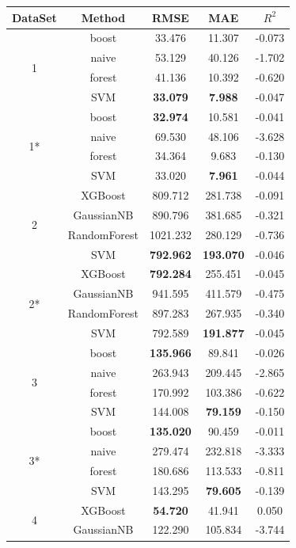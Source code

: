 \documentclass[conference,compsoc]{IEEEtran}
\begin{document}
\begin{table}[!t]
\centering
\begin{tabular}{c|c|c|c|c}
DataSet & Method & RMSE & MAE & $R^2$ \\
\hline
\multirow{4}{*}{1}
& boost & 33.476 & 11.307 & -0.073 \\
& naive & 53.129 & 40.126 & -1.702 \\
& forest & 41.136 & 10.392 & -0.620 \\
& SVM & \textbf{33.079} & \textbf{7.988} & -0.047 \\
\hline
\multirow{4}{*}{1*}
& boost & \textbf{32.974} & 10.581 & -0.041 \\
& naive & 69.530 & 48.106 & -3.628 \\
& forest & 34.364 & 9.683 & -0.130 \\
& SVM & 33.020 & \textbf{7.961} & -0.044 \\
\hline
\multirow{4}{*}{2}
& XGBoost & 809.712 & 281.738 & -0.091 \\
& GaussianNB & 890.796 & 381.685 & -0.321 \\
& RandomForest & 1021.232 & 280.129 & -0.736 \\
& SVM & \textbf{792.962} & \textbf{193.070} & -0.046 \\
\hline
\multirow{4}{*}{2*}
& XGBoost & \textbf{792.284} & 255.451 & -0.045 \\
& GaussianNB & 941.595 & 411.579 & -0.475 \\
& RandomForest & 897.283 & 267.935 & -0.340 \\
& SVM & 792.589 & \textbf{191.877} & -0.045 \\
\hline
\multirow{4}{*}{3}
& boost & \textbf{135.966} & 89.841 & -0.026 \\
& naive & 263.943 & 209.445 & -2.865 \\
& forest & 170.992 & 103.386 & -0.622 \\
& SVM & 144.008 & \textbf{79.159} & -0.150 \\
\hline
\multirow{4}{*}{3*}
& boost & \textbf{135.020} & 90.459 & -0.011 \\
& naive & 279.474 & 232.818 & -3.333 \\
& forest & 180.686 & 113.533 & -0.811 \\
& SVM & 143.295 & \textbf{79.605} & -0.139 \\
\hline
\multirow{4}{*}{4}
& XGBoost & \textbf{54.720} & 41.941 & 0.050 \\
& GaussianNB & 122.290 & 105.834 & -3.744 \\

\end{tabular}
\end{table}
\end{document}
